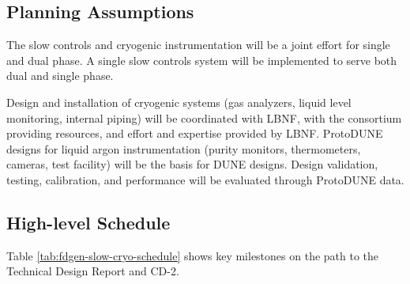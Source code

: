 \subsection{Planning Assumptions}
\label{sec:fdgen-slow-cryo-org-assmp}

The slow controls and cryogenic instrumentation will be a joint effort for single and dual phase.
A single slow controls system will be implemented to serve both dual and single phase.

Design and installation of cryogenic systems (gas analyzers, liquid level monitoring, internal piping) will be coordinated with LBNF, with the consortium providing resources, and effort and expertise provided by LBNF.
ProtoDUNE designs for liquid argon instrumentation (purity monitors, thermometers, cameras, test facility) will be the basis for DUNE designs. Design validation, testing, calibration, and performance will be evaluated through ProtoDUNE data.



\subsection{High-level Schedule}
\label{sec:fdgen-slow-cryo-org-cs}

Table \ref{tab:fdgen-slow-cryo-schedule} shows key milestones on
the path to the Technical Design Report and CD-2.

